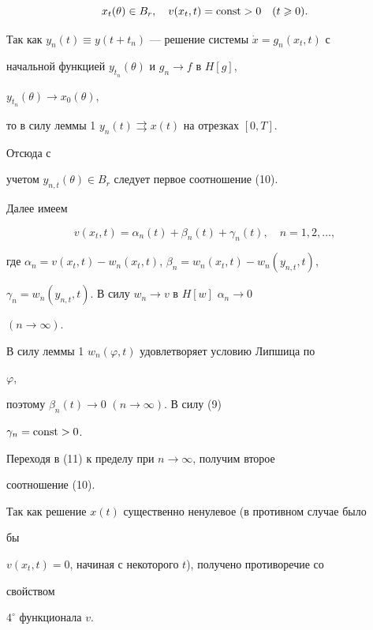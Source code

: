 \begin{pf}
\begin{equation}
x_t(\theta)\in B_r,\quad v(x_t,t)=\const>0\quad (t\geqslant 0).


\end{equation}


Так как $y_n(t)\equiv y(t+t_n)$ --- решение системы $\Dot


x=g_n(x_t,t)$ с


начальной функцией $y_{t_n}(\theta)$ и $g_n\to f$ в $H[g]$,


$y_{t_n}(\theta)\to x_0(\theta)$,


то в силу леммы 1\; $y_n(t)\rightrightarrows x(t)$ на отрезках $[0,T]$.


Отсюда с


учетом $y_{n,t}(\theta)\in B_r$ следует первое соотношение (10).


Далее имеем


\begin{equation}


v(x_t,t)=\alpha_n(t)+\beta_n(t)+\gamma_n(t),\quad n=1,2,\dotsc,


\end{equation}


где $\alpha_n=v(x_t,t)-w_n(x_t,t)$, $\beta_n=w_n(x_t,t)-


w_n(y_{n,t},t)$,


$\gamma_n=w_n(y_{n,t},t)$. В силу $w_n\to v$ в $H[w]$ $\alpha_n\to 0$


$(n\to\infty)$.


В силу леммы 1\; $w_n(\varphi,t)$ удовлетворяет условию Липшица по


$\varphi$,


поэтому $\beta_n(t)\to 0$ $(n\to\infty)$. В силу (9)


$\gamma_n=\operatorname{const}>0$.


Переходя в (11) к пределу при $n\to\infty$, получим второе


соотношение (10).


Так как решение $x(t)$ существенно ненулевое (в противном случае было


бы


$v(x_t,t)=0$, начиная с некоторого $t$), получено противоречие со


свойством


$4^{\circ}$ функционала $v$.


\end{pf}






